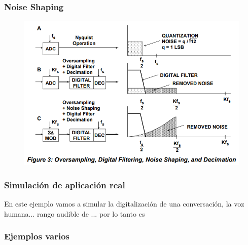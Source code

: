 \subsubsection{Noise Shaping}

\begin{figure}[H]
	\centering
	\includegraphics[width=0.7\linewidth]{ImagenesEjercicio2/NoiseShappingAN}
	\caption{}
	\label{fig:noiseshappingan}
\end{figure}


\subsubsection{Simulación de aplicación real}
En este ejemplo vamos a simular la digitalización de una conversación, la voz humana... rango audible de ... por lo tanto es 

\subsubsection{Ejemplos varios}

